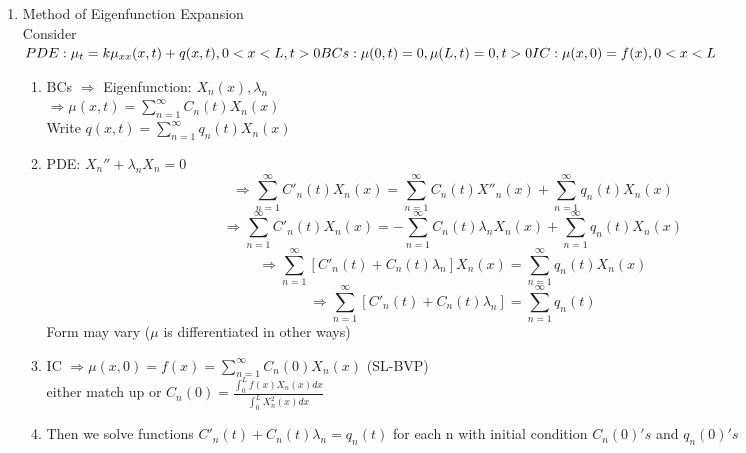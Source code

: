 \documentclass[10pt]{article}
\begin{document}
\begin{multicols}{2}
\begin{enumerate}
		
	\item Method of Eigenfunction Expansion\\
		Consider\\
		$PDE: \mu_t = k\mu_{xx}(x,t) + q(x,t), 0<x<L, t > 0\\
		BCs: \mu(0,t) = 0, \mu(L,t) = 0, t > 0\\
		IC: \mu(x, 0) = f(x), 0<x<L$
		\begin{enumerate}
			\item BCs $\Rightarrow$ Eigenfunction:  $X_n(x), \lambda_n$\\
			$\Rightarrow \mu(x,t) = \sum_{n = 1}^{\infty}C_n(t)X_n(x)$\\
			Write $q(x,t) = \sum_{n = 1}^{\infty}q_n(t)X_n(x)$
			\item PDE: $X_n'' + \lambda_n X_n = 0$ $$\Rightarrow \sum_{n = 1}^{\infty}C'_n(t)X_n(x) = \sum_{n = 1}^{\infty}C_n(t)X''_n(x)+\sum_{n = 1}^{\infty}q_n(t)X_n(x)$$
			$$\Rightarrow \sum_{n = 1}^{\infty}C'_n(t)X_n(x) = -\sum_{n = 1}^{\infty}C_n(t)\lambda_n X_n(x)+\sum_{n = 1}^{\infty}q_n(t)X_n(x)$$
			$$\Rightarrow \sum_{n = 1}^{\infty}[C'_n(t)+C_n(t)\lambda_n]X_n(x) = \sum_{n = 1}^{\infty}q_n(t)X_n(x)$$
			$$\Rightarrow \sum_{n = 1}^{\infty}[C'_n(t)+C_n(t)\lambda_n] = \sum_{n = 1}^{\infty}q_n(t)$$
			Form may vary ($\mu$ is differentiated in other ways)
			\item IC $\Rightarrow \mu(x,0) = f(x) = \sum_{n=1}^{\infty}C_n(0)X_n(x)$ (SL-BVP)\\
			either match up or $C_n(0) = \frac{\int_{0}^{L}f(x)X_n(x)dx}{\int_{0}^{L}X_n^2(x)dx}$
			\item Then we solve functions $C'_n(t)+C_n(t)\lambda_n = q_n(t)$ for each n with initial condition $C_n(0)'s$ and $q_n(0)'s$
		\end{enumerate}
	

\end{enumerate}
\end{multicols}
\end{document}
